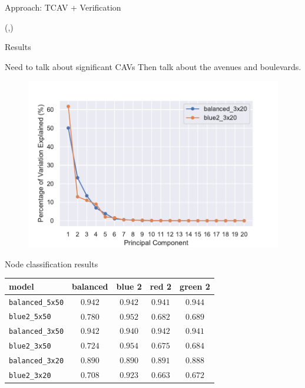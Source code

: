 \documentclass[final]{beamer}
\begin{document}
\begin{frame}[fragile]{}
\begin{textblock}{\colwidth}
\begin{paddedBlock}{Approach: TCAV + Verification}
\end{paddedBlock}
\end{textblock}


\begin{textblock}{\colwidth}(\thirdcolpos,\vstartCols)




\begin{paddedBlock}{Results}

\alert{Need to talk about significant CAVs}
Then talk about the avenues and boulevards.

\begin{figure}
    \centering
    \includegraphics[width=.8\textwidth]{img/scree_plot}
    \label{fig:big}
\end{figure}

\alert{Node classification results}

\begin{table}
\centering
\begin{tabular}{lcccc}
\hline

\textbf{model} &  \textbf{balanced} &   \textbf{blue 2} &    \textbf{red 2} &  \textbf{green 2} \\ \hline 
\texttt{balanced\_5x50} &    $0.942$ &  $0.942$ &  $0.941$ &  $0.944$ \\
\texttt{blue2\_5x50} &    $0.780$ &  $0.952$ &  $0.682$ &  $0.689$ \\
\texttt{balanced\_3x50} &    $0.942$ &  $0.940$ &  $0.942$ &  $0.941$ \\
\texttt{blue2\_3x50} &    $0.724$ &  $0.954$ &  $0.675$ &  $0.684$ \\
\texttt{balanced\_3x20} &    $0.890$ &  $0.890$ &  $0.891$ &  $0.888$ \\
\texttt{blue2\_3x20} &    $0.708$ &  $0.923$ &  $0.663$ &  $0.672$ \\
\hline


\end{tabular}
\end{table}
\end{paddedBlock}
\end{textblock}
\end{frame}
\end{document}

